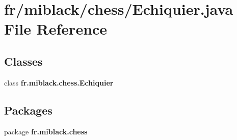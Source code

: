 \section{fr/miblack/chess/\-Echiquier.java File Reference}
\label{Echiquier_8java}
\subsection*{Classes}
\begin{DoxyCompactItemize}
\item 
class {\bf fr.\-miblack.\-chess.\-Echiquier}
\end{DoxyCompactItemize}
\subsection*{Packages}
\begin{DoxyCompactItemize}
\item 
package {\bf fr.\-miblack.\-chess}
\end{DoxyCompactItemize}

